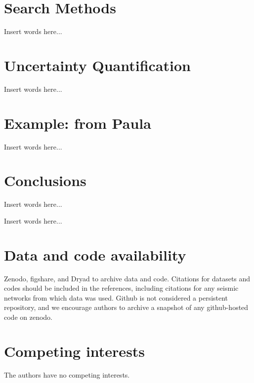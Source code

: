 \documentclass[preprint]{seismica}
\begin{document}
\section{Search Methods} \label{sec:algorithms}

    Insert words here...

\section{Uncertainty Quantification} \label{sec:uncertainty}

    Insert words here...

\section{Example: from Paula} \label{sec:example}

    Insert words here...

\section{Conclusions} \label{sec:conclusion}

    Insert words here...

\begin{acknowledgements}
    [Suzan] Insert words here...
\end{acknowledgements}

\section*{Data and code availability}
Zenodo, figshare, and Dryad to archive data and code. Citations for datasets and codes should be included in the references, including citations for any seismic networks from which data was used. Github is not considered a persistent repository, and we encourage authors to archive a snapshot of any github-hosted code on zenodo.

\section*{Competing interests}
    The authors have no competing interests.


   
\end{document}
